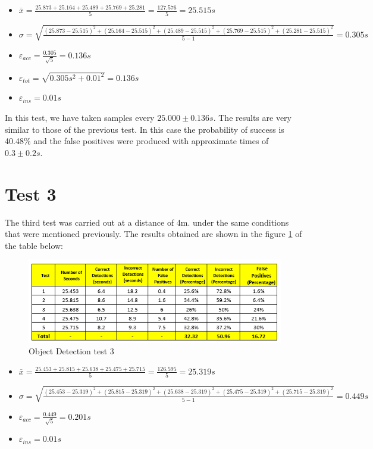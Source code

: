 \pagebreak
\begin{itemize}
	\item $ \overline{x} = \frac{25.873 +  25.164 + 25.489  + 25.769 +  25.281} {5} = \frac{127.576}{5} = 25.515s $ 	
	\item $ \sigma =  {\sqrt{\frac{(25.873 - 25.515)^2 +  (25.164 - 25.515)^2 + (25.489 - 25.515)^2  + (25.769 - 25.515)^2+  (25.281 - 25.515)^2}{5 - 1}}} = 0.305s$
 	\item $\varepsilon{_{acc}} =  {\frac{0.305}{\sqrt{5}}} = 0.136s$
	\item $\varepsilon{_{tot}}=  {\sqrt{ 0.305s^{2} + 0.01^{2}}} = 0.136s$
	\item $ \varepsilon{_{ins}} =  {0.01s} $ 	
\end{itemize}

In this test, we have taken samples every \begin{math}25.000\pm0.136s\end{math}. The results are very similar to those of the previous test. In this case the probability of success is 40.48\% and the false positives were produced with approximate times of \begin{math} 0.3\pm0.2s\end{math}.


\section{Test 3}
The third test was carried out at a distance of 4m. under the same conditions that were mentioned previously. The results obtained are shown in the figure \ref{object_table_3} of the table below:

\begin{figure}[h]
\centering
\includegraphics[scale=0.8]{figures/test_table_3.png}
\caption{Object Detection test 3}
\label{object_table_3}
\end{figure}

\pagebreak
\begin{itemize}
	\item $ \overline{x} = \frac{25.453 +  25.815 + 25.638  + 25.475 + 25.715} {5} = \frac{126.595}{5} = 25.319s $ 	
	\item $ \sigma =  {\sqrt{\frac{(25.453 - 25.319)^2 +  (25.815 - 25.319)^2 + (25.638 - 25.319)^2  + (25.475 - 25.319)^2+  ( 25.715 - 25.319)^2}{5 - 1}}} = 0.449s$
	\item $\varepsilon{_{acc}} =  {\frac{0.449}{\sqrt{5}}} = 0.201s$
	\item $ \varepsilon{_{ins}} =  {0.01s} $ 
\end{itemize}

